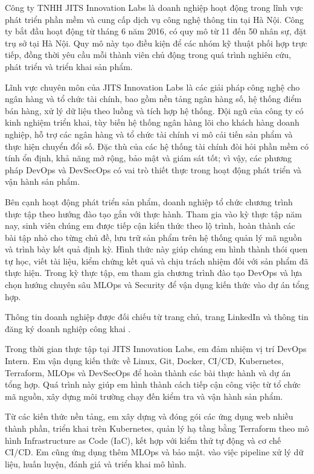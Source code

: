 Công ty TNHH JITS Innovation Labs là doanh nghiệp hoạt động trong lĩnh vực phát triển phần mềm và cung cấp dịch vụ công nghệ thông tin tại Hà Nội. Công ty bắt đầu hoạt động từ tháng 6 năm 2016, có quy mô từ 11 đến 50 nhân sự, đặt trụ sở tại Hà Nội. Quy mô này tạo điều kiện để các nhóm kỹ thuật phối hợp trực tiếp, đồng thời yêu cầu mỗi thành viên chủ động trong quá trình nghiên cứu, phát triển và triển khai sản phẩm.

Lĩnh vực chuyên môn của JITS Innovation Labs là các giải pháp công nghệ cho ngân hàng và tổ chức tài chính, bao gồm nền tảng ngân hàng số, hệ thống điểm bán hàng, xử lý dữ liệu theo luồng và tích hợp hệ thống. Đội ngũ của công ty có kinh nghiệm triển khai, tùy biến hệ thống ngân hàng lõi cho khách hàng doanh nghiệp, hỗ trợ các ngân hàng và tổ chức tài chính vi mô cải tiến sản phẩm và thực hiện chuyển đổi số. Đặc thù của các hệ thống tài chính đòi hỏi phần mềm có tính ổn định, khả năng mở rộng, bảo mật và giám sát tốt; vì vậy, các phương pháp DevOps và DevSecOps có vai trò thiết thực trong hoạt động phát triển và vận hành sản phẩm.

Bên cạnh hoạt động phát triển sản phẩm, doanh nghiệp tổ chức chương trình thực tập theo hướng đào tạo gắn với thực hành. Tham gia vào kỳ thực tập năm nay, sinh viên chúng em được tiếp cận kiến thức theo lộ trình, hoàn thành các bài tập nhỏ cho từng chủ đề, lưu trữ sản phẩm trên hệ thống quản lý mã nguồn và trình bày kết quả định kỳ. Hình thức này giúp chúng em hình thành thói quen tự học, viết tài liệu, kiểm chứng kết quả và chịu trách nhiệm đối với sản phẩm đã thực hiện. Trong kỳ thực tập, em tham gia chương trình đào tạo DevOps và lựa chọn hướng chuyên sâu MLOps và Security để vận dụng kiến thức vào dự án tổng hợp.

Thông tin doanh nghiệp được đối chiếu từ trang chủ, trang LinkedIn và thông tin đăng ký doanh nghiệp công khai \cite{jits-home,jits-linkedin,business-registry}.

Trong thời gian thực tập tại JITS Innovation Labs, em đảm nhiệm vị trí DevOps Intern. Em vận dụng kiến thức về Linux, Git, Docker, CI/CD, Kubernetes, Terraform, MLOps và DevSecOps để hoàn thành các bài thực hành và dự án tổng hợp. Quá trình này giúp em hình thành cách tiếp cận công việc từ tổ chức mã nguồn, xây dựng môi trường chạy đến kiểm tra và vận hành sản phẩm.

Từ các kiến thức nền tảng, em xây dựng và đóng gói các ứng dụng web nhiều thành phần, triển khai trên Kubernetes, quản lý hạ tầng bằng Terraform theo mô hình Infrastructure as Code (IaC), kết hợp với kiểm thử tự động và cơ chế CI/CD. Em cũng ứng dụng thêm MLOps và bảo mật. vào việc pipeline xử lý dữ liệu, huấn luyện, đánh giá và triển khai mô hình.

